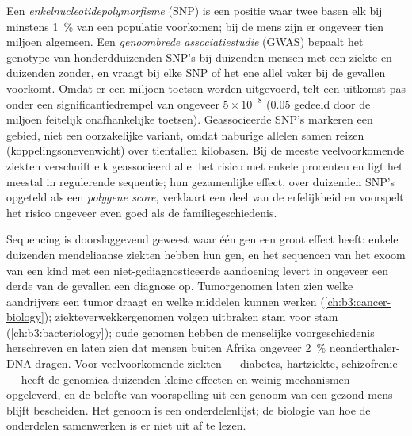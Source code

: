 \begin{definition}\label{def:b3:genomics:gwas}
Een \emph{enkelnucleotidepolymorfisme} (SNP) is een positie waar twee
basen elk bij minstens \qty{1}{\%} van een populatie voorkomen; bij de
mens zijn er ongeveer tien miljoen algemeen. Een \emph{genoombrede
associatiestudie} (GWAS) bepaalt het genotype van honderdduizenden
SNP's bij duizenden mensen met een ziekte en duizenden zonder, en
vraagt bij elke SNP of het ene allel vaker bij de gevallen voorkomt.
Omdat er een miljoen toetsen worden uitgevoerd, telt een uitkomst pas
onder een significantiedrempel van ongeveer $5\times 10^{-8}$ ($0.05$
gedeeld door de miljoen feitelijk onafhankelijke toetsen).
Geassocieerde SNP's markeren een gebied, niet een oorzakelijke
variant, omdat naburige allelen samen reizen
(koppelingsonevenwicht) over tientallen kilobasen. Bij de meeste
veelvoorkomende ziekten verschuift elk geassocieerd allel het risico
met enkele procenten en ligt het meestal in regulerende sequentie; hun
gezamenlijke effect, over duizenden SNP's opgeteld als een
\emph{polygene score}, verklaart een deel van de erfelijkheid en
voorspelt het risico ongeveer even goed als de familiegeschiedenis.
\end{definition}

\begin{remark}\label{rem:b3:genomics:delivered}
Sequencing is doorslaggevend geweest waar één gen een groot effect
heeft: enkele duizenden mendeliaanse ziekten hebben hun gen, en het
sequencen van het exoom van een kind met een niet-gediagnosticeerde
aandoening levert in ongeveer een derde van de gevallen een diagnose
op. Tumorgenomen laten zien welke aandrijvers een tumor draagt en welke
middelen kunnen werken (\cref{ch:b3:cancer-biology});
ziekteverwekkergenomen volgen uitbraken stam voor stam
(\cref{ch:b3:bacteriology}); oude genomen hebben de menselijke
voorgeschiedenis herschreven en laten zien dat mensen buiten Afrika
ongeveer \qty{2}{\%} neanderthaler-DNA dragen. Voor veelvoorkomende
ziekten --- diabetes, hartziekte, schizofrenie --- heeft de genomica
duizenden kleine effecten en weinig mechanismen opgeleverd, en de
belofte van voorspelling uit een genoom van een gezond mens blijft
bescheiden. Het genoom is een onderdelenlijst; de biologie van hoe de
onderdelen samenwerken is er niet uit af te lezen.
\end{remark}


